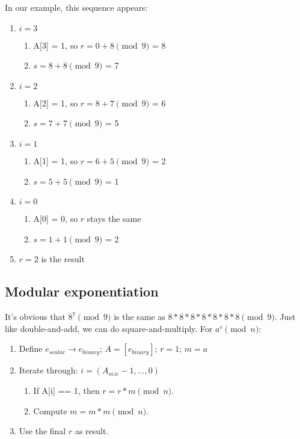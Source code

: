 In our example, this sequence appears:

\begin{enumerate}
	\item $i = 3$
	\begin{enumerate}
		\item A[3] = 1, so $r = 0 + 8 \pmod 9$ = 8
		\item $s = 8 + 8 \pmod 9$ = 7
	\end{enumerate}
	\item $i = 2$
	\begin{enumerate}
		\item A[2] = 1, so $r = 8 + 7 \pmod 9$ = 6
		\item $s = 7 + 7 \pmod 9$ = 5
	\end{enumerate}
	\item $i = 1$
	\begin{enumerate}
		\item A[1] = 1, so $r = 6 + 5 \pmod 9$ = 2
		\item $s = 5 + 5 \pmod 9$ = 1
	\end{enumerate}
	\item $i = 0$
	\begin{enumerate}
		\item A[0] = 0, so $r$ stays the same
		\item $s = 1 + 1 \pmod 9$ = 2
	\end{enumerate}
	\item $r = 2$ is the result
\end{enumerate}


\subsection{Modular exponentiation}

It's obvious that $8^7 \pmod 9$ is the same as $8*8*8*8*8*8*8 \pmod 9$. Just like double-and-add, we can do square-and-multiply. For $a^e \pmod{n}$:

\begin{enumerate}
	\item Define $e_{scalar} \rightarrow e_{binary}$; $A = [e_{binary}]$; $r = 1$; $m = a$
	\item Iterate through: $i = (A_{size} - 1,...,0)$
	\begin{enumerate}
		\item If A[i] == 1, then $r = r * m \pmod n$.
		\item Compute $m = m * m \pmod n$.
	\end{enumerate}
	\item Use the final $r$ as result.
\end{enumerate}


